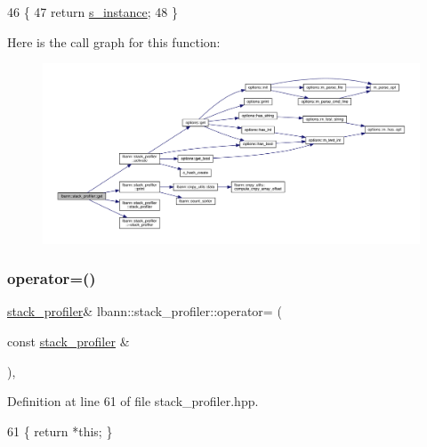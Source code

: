 \begin{DoxyCode}
46                                                                         \{
47     \textcolor{keywordflow}{return} \hyperlink{classlbann_1_1stack__profiler_a7a1803ee126dfb5a215c5966458451fd}{s\_instance};
48   \}
\end{DoxyCode}
Here is the call graph for this function\+:\nopagebreak
\begin{figure}[H]
\begin{center}
\leavevmode
\includegraphics[width=350pt]{classlbann_1_1stack__profiler_ab1a7c0531a78ad7e2181a10daee44def_cgraph}
\end{center}
\end{figure}
\mbox{\label{classlbann_1_1stack__profiler_adac8efbe72cf9186a726798dc4efe91a}} 
\subsubsection{\texorpdfstring{operator=()}{operator=()}}
{\footnotesize\ttfamily \hyperlink{classlbann_1_1stack__profiler}{stack\+\_\+profiler}\& lbann\+::stack\+\_\+profiler\+::operator= (\begin{DoxyParamCaption}\item[{const \hyperlink{classlbann_1_1stack__profiler}{stack\+\_\+profiler} \&}]{ }\end{DoxyParamCaption})\hspace{0.3cm}{\ttfamily [inline]}, {\ttfamily [private]}}



Definition at line 61 of file stack\+\_\+profiler.\+hpp.


\begin{DoxyCode}
61 \{ \textcolor{keywordflow}{return} *\textcolor{keyword}{this}; \}
\end{DoxyCode}
\mbox{\label{classlbann_1_1stack__profiler_a27d55f6551cf445d3d0e9836858f6872}} 
